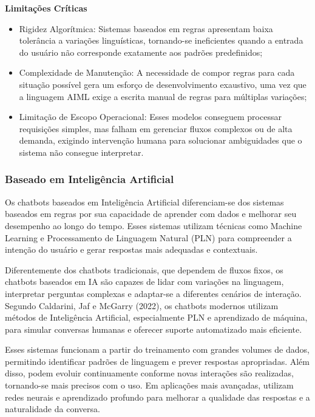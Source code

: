 \documentclass[12pt,a4paper]{extarticle}
\begin{document}
\textbf{Limitações Críticas}
\begin{itemize}
    \item Rigidez Algorítmica: Sistemas baseados em regras apresentam baixa tolerância a variações linguísticas, tornando-se ineficientes quando a entrada do usuário não corresponde exatamente aos padrões predefinidos;
    \item Complexidade de Manutenção: A necessidade de compor regras para cada situação possível gera um esforço de desenvolvimento exaustivo, uma vez que a linguagem AIML exige a escrita manual de regras para múltiplas variações;
    \item Limitação de Escopo Operacional: Esses modelos conseguem processar requisições simples, mas falham em gerenciar fluxos complexos ou de alta demanda, exigindo intervenção humana para solucionar ambiguidades que o sistema não consegue interpretar.
\end{itemize}

\subsubsection{Baseado em Inteligência Artificial}
\label{sec:ia}

Os chatbots baseados em Inteligência Artificial diferenciam-se dos sistemas baseados em regras por sua capacidade de aprender com dados e melhorar seu desempenho ao longo do tempo. Esses sistemas utilizam técnicas como Machine Learning e Processamento de Linguagem Natural (PLN) para compreender a intenção do usuário e gerar respostas mais adequadas e contextuais.

Diferentemente dos chatbots tradicionais, que dependem de fluxos fixos, os chatbots baseados em IA são capazes de lidar com variações na linguagem, interpretar perguntas complexas e adaptar-se a diferentes cenários de interação. Segundo Caldarini, Jaf e McGarry (2022), os chatbots modernos utilizam métodos de Inteligência Artificial, especialmente PLN e aprendizado de máquina, para simular conversas humanas e oferecer suporte automatizado mais eficiente.

Esses sistemas funcionam a partir do treinamento com grandes volumes de dados, permitindo identificar padrões de linguagem e prever respostas apropriadas. Além disso, podem evoluir continuamente conforme novas interações são realizadas, tornando-se mais precisos com o uso. Em aplicações mais avançadas, utilizam redes neurais e aprendizado profundo para melhorar a qualidade das respostas e a naturalidade da conversa.
\end{document}
